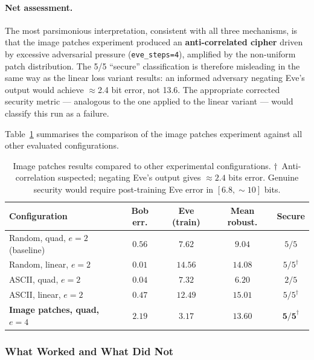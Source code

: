 \documentclass[12pt, a4paper]{article}
\newcommand{\code}[1]{\texttt{\color{CodeRed}#1}}
\begin{document}
\paragraph{Net assessment.}
The most parsimonious interpretation, consistent with all three mechanisms,
is that the image patches experiment produced an \textbf{anti-correlated
	cipher} driven by excessive adversarial pressure (\code{eve\_steps=4}),
amplified by the non-uniform patch distribution. The 5/5 ``secure''
classification is therefore misleading in the same way as the linear
loss variant results: an informed adversary negating Eve's output would
achieve $\approx$2.4 bit error, not 13.6. The appropriate corrected
security metric --- analogous to the one applied to the linear variant ---
would classify this run as a failure.

Table~\ref{tab:image_patches_comparison} summarises the comparison of the
image patches experiment against all other evaluated configurations.

\begin{table}[H]
	\centering
	\caption{Image patches results compared to other experimental configurations.
		$\dagger$~Anti-correlation suspected; negating Eve's output
		gives $\approx 2.4$ bits error. Genuine security would require
		post-training Eve error in $[6.8, \sim 10]$ bits.}
	\label{tab:image_patches_comparison}
	\renewcommand{\arraystretch}{1.4}
	\begin{tabularx}{\linewidth}{@{} l c c c c @{}}
		\toprule
		\textbf{Configuration} & \textbf{Bob err.} &
		\textbf{Eve (train)} & \textbf{Mean robust.} & \textbf{Secure} \\
		\midrule
		Random, quad, $e=2$ (baseline) &
		$0.56$ & $7.62$ & $9.04$ & $5/5$ \\
		Random, linear, $e=2$ &
		$0.01$ & $14.56$ & $14.08$ & $5/5^\dagger$ \\
		ASCII, quad, $e=2$ &
		$0.04$ & $7.32$  & $6.20$ & $2/5$ \\
		ASCII, linear, $e=2$ &
		$0.47$ & $12.49$ & $15.01$ & $5/5^\dagger$ \\
		\textbf{Image patches, quad, $e=4$} &
		$\mathbf{2.19}$ & $\mathbf{3.17}$ & $\mathbf{13.60}$ & $\mathbf{5/5}^\dagger$ \\
		\bottomrule
	\end{tabularx}
\end{table}

\subsubsection*{What Worked and What Did Not}
\end{document}
